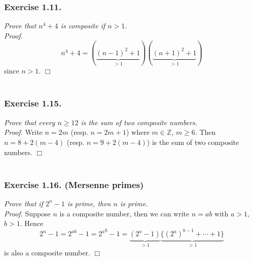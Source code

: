 \documentclass{article}
\begin{document}



\subsubsection*{Exercise 1.11.}
\emph{Prove that $n^4 + 4$ is composite if $n > 1$.} \\



\emph{Proof.}
  \[
    n^4 + 4
    = (\underbrace{(n-1)^2 + 1}_{> 1})(\underbrace{(n+1)^2 + 1}_{> 1})
  \]
  since $n > 1$.
$\Box$ \\\\






\subsubsection*{Exercise 1.15.}
\emph{Prove that every $n \geq 12$ is the sum of two composite numbers.} \\



\emph{Proof.}
  Write $n = 2m$ (resp. $n = 2m + 1$) where $m \in \mathbb{Z}$, $m \geq 6$.
  Then $n = 8 + 2(m-4)$ (resp. $n = 9 + 2(m-4)$) is the sum of two composite numbers.
$\Box$ \\\\






\subsubsection*{Exercise 1.16. (Mersenne primes)}
\emph{Prove that if $2^n-1$ is prime, then $n$ is prime.} \\



\emph{Proof.}
  Suppose $n$ is a composite number,
  then we can write $n = ab$ with $a > 1$, $b > 1$.
  Hence
  \[
    2^n - 1
    = 2^{ab} - 1
    = {2^a}^b - 1
    = \underbrace{(2^a - 1)}_{> 1}\underbrace{\{(2^a)^{b-1} + \cdots + 1\}}_{> 1}
  \]
  is also a composite number.
$\Box$ \\\\
\end{document}
